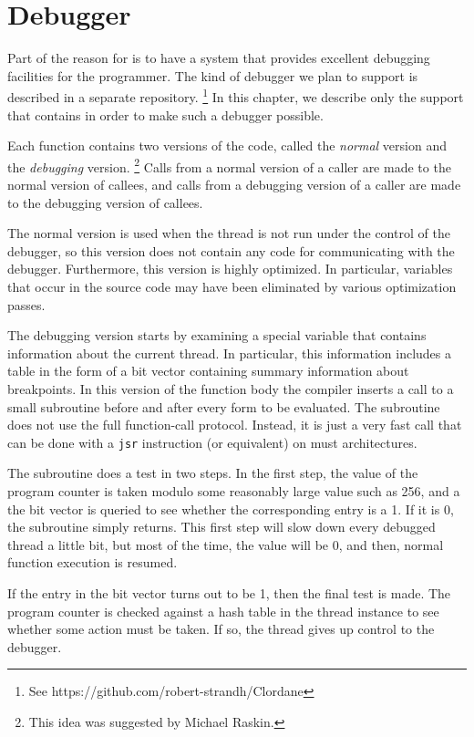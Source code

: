 \chapter{Debugger}
\label{chap-debugger}

Part of the reason for \sysname{} is to have a system that provides
excellent debugging facilities for the programmer.  The kind of
debugger we plan to support is described in a separate repository.%
\footnote{See https://github.com/robert-strandh/Clordane}  In this
chapter, we describe only the support that \sysname{} contains in
order to make such a debugger possible.

Each function contains two versions of the code, called the
\emph{normal} version and the \emph{debugging} version.%
\footnote{This idea was suggested by Michael Raskin.}
Calls from a normal version of a caller are made to the normal version
of callees, and calls from a debugging version of a caller are made to
the debugging version of callees.

The normal version is used when the thread is not run under the
control of the debugger, so this version does not contain any code for
communicating with the debugger.  Furthermore, this version is highly
optimized.  In particular, variables that occur in the source code may
have been eliminated by various optimization passes.

The debugging version starts by examining a special variable that
contains information about the current thread.  In particular, this
information includes a table in the form of a bit vector containing
summary information about breakpoints.  In this version of the
function body the compiler inserts a call to a small subroutine before
and after every form to be evaluated.  The subroutine does not use the
full \commonlisp{} function-call protocol.  Instead, it is just a very
fast call that can be done with a \texttt{jsr} instruction (or
equivalent) on must architectures.

The subroutine does a test in two steps.  In the first step, the value
of the program counter is taken modulo some reasonably large value
such as 256, and a the bit vector is queried to see whether the
corresponding entry is a 1.  If it is 0, the subroutine simply
returns.  This first step will slow down every debugged thread a
little bit, but most of the time, the value will be 0, and then,
normal function execution is resumed.

If the entry in the bit vector turns out to be 1, then the final test
is made.  The program counter is checked against a hash table in the
thread instance to see whether some action must be taken.  If so, the
thread gives up control to the debugger.

